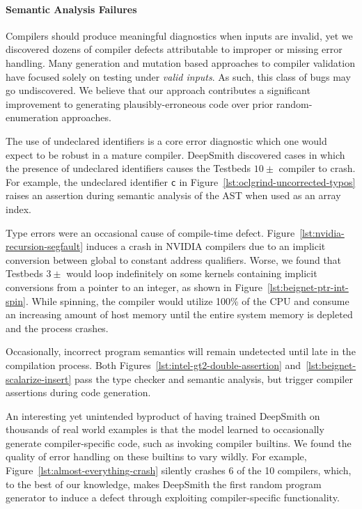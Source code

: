 \paragraph{Semantic Analysis Failures}

Compilers should produce meaningful diagnostics when inputs are invalid, yet we
discovered dozens of compiler defects attributable to improper or missing error
handling. Many generation and mutation based approaches to compiler validation
have focused solely on testing under \emph{valid inputs}. As such, this class of
bugs may go undiscovered. We believe that our approach contributes a significant
improvement to generating plausibly-erroneous code over prior random-enumeration
approaches.

The use of undeclared identifiers is a core error diagnostic which one would
expect to be robust in a mature compiler. DeepSmith discovered cases in which
the presence of undeclared identifiers causes the Testbeds $10\pm$ compiler to
crash. For example, the undeclared identifier \texttt{c} in
Figure~\ref{lst:oclgrind-uncorrected-typos} raises an assertion during semantic
analysis of the AST when used as an array index.

Type errors were an occasional cause of compile-time defect.
Figure~\ref{lst:nvidia-recursion-segfault} induces a crash in NVIDIA compilers
due to an implicit conversion between global to constant address qualifiers.
Worse, we found that Testbeds $3\pm$ would loop indefinitely on some kernels
containing implicit conversions from a pointer to an integer, as shown in
Figure~\ref{lst:beignet-ptr-int-spin}. While spinning, the compiler would
utilize 100\% of the CPU and consume an increasing amount of host memory until
the entire system memory is depleted and the process crashes.

Occasionally, incorrect program semantics will remain undetected until late in
the compilation process. Both Figures~\ref{lst:intel-gt2-double-assertion}
and~\ref{lst:beignet-scalarize-insert} pass the type checker and semantic
analysis, but trigger compiler assertions during code generation.

An interesting yet unintended byproduct of having trained DeepSmith on thousands
of real world examples is that the model learned to occasionally generate
compiler-specific code, such as invoking compiler builtins. We found the quality
of error handling on these builtins to vary wildly. For example,
Figure~\ref{lst:almost-everything-crash} silently crashes 6 of the 10 compilers,
which, to the best of our knowledge, makes DeepSmith the first random program
generator to induce a defect through exploiting compiler-specific functionality.

